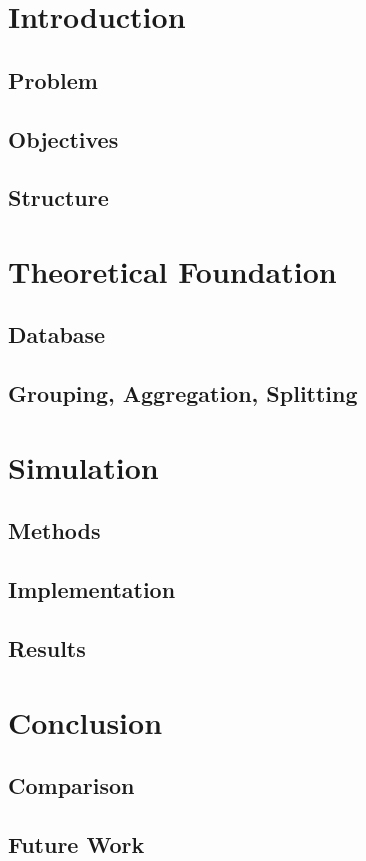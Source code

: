 \setcounter{page}{1}
\pagestyle{fancy}
\fancyhf{}
\fancyhead[R]{\thepage}
\renewcommand{\headrulewidth}{0pt} %

\section{Introduction}

\subsection{Problem}
\subsection{Objectives}
\subsection{Structure}

\section{Theoretical Foundation}

\subsection{Database}
\subsection{Grouping, Aggregation, Splitting}

\section{Simulation}

\subsection{Methods}
\subsection{Implementation}
\subsection{Results}

\section{Conclusion}
\subsection{Comparison}
\subsection{Future Work}